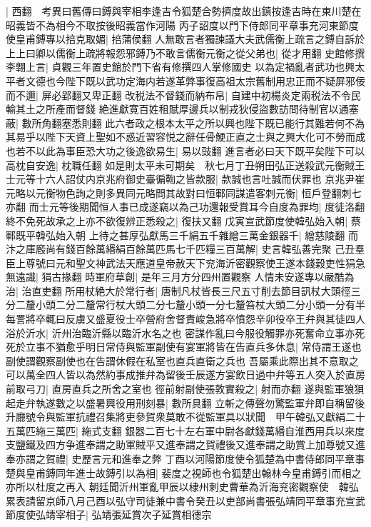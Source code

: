 |{
	西翻　考異曰舊傳曰鎛與宰相李逢吉令狐楚合勢擠度故出鎮按逢吉時在東川楚在昭義皆不為相今不取按後昭義當作河陽}
丙子詔度以門下侍郎同平章事充河東節度使皇甫鎛專以掊克取媚|{
	掊蒲侯翻}
人無敢言者獨諫議大夫武儒衡上疏言之鎛自訴於上上曰卿以儒衡上疏將報怨邪鎛乃不敢言儒衡元衡之從父弟也|{
	從才用翻}
史館修撰李翺上言|{
	貞觀三年置史館於門下省有修撰四人掌修國史}
以為定禍亂者武功也興太平者文德也今陛下既以武功定海内若遂革弊事復高祖太宗舊制用忠正而不疑屏邪佞而不邇|{
	屏必郢翻又卑正翻}
改税法不督錢而納布帛|{
	自建中初楊炎定兩税法不令民輸其土之所產而督錢}
絶進獻寛百姓租賦厚邊兵以制戎狄侵盜數訪問待制官以通塞蔽|{
	數所角翻塞悉則翻}
此六者政之根本太平之所以興也陛下既已能行其難若何不為其易乎以陛下天資上聖如不惑近習容悦之辭任骨鯁正直之士與之興大化可不勞而成也若不以此為事臣恐大功之後逸欲易生|{
	易以豉翻}
進言者必曰天下既平矣陛下可以高枕自安逸|{
	枕職任翻}
如是則太平未可期矣　秋七月丁丑朔田弘正送殺武元衡賊王士元等十六人詔仗内京兆府御史臺徧鞫之皆款服|{
	款誠也言吐誠而伏罪也}
京兆尹崔元略以元衡物色詢之則多異同元略問其故對曰恒鄆同謀遣客刺元衡|{
	恒戶登翻刺七亦翻}
而士元等後期聞恒人事已成遂竊以為己功還報受賞耳今自度為罪均|{
	度徒洛翻}
終不免死故承之上亦不欲復辨正悉殺之|{
	復扶又翻}
戊寅宣武節度使韓弘始入朝|{
	蔡鄆既平韓弘始入朝}
上待之甚厚弘獻馬三千絹五千雜繒三萬金銀器千|{
	繒慈陵翻}
而汴之庫廏尚有錢百餘萬緡絹百餘萬匹馬七千匹糧三百萬解|{
	史言韓弘善完聚}
己丑羣臣上尊號曰元和聖文神武法天應道皇帝赦天下兖海沂密觀察使王遂本錢穀吏性狷急無遠識|{
	狷古掾翻}
時軍府草創|{
	是年三月方分四州置觀察}
人情未安遂專以嚴酷為治|{
	治直吏翻}
所用杖絶大於常行者|{
	唐制凡杖皆長三尺五寸削去節目訊杖大頭徑三分二釐小頭二分二釐常行杖大頭二分七釐小頭一分七釐笞杖大頭二分小頭一分有半}
每詈將卒輒曰反虜又盛夏役士卒營府舍督責峻急將卒憤怨辛卯役卒王弁與其徒四人浴於沂水|{
	沂州治臨沂縣以臨沂水名之也}
密謀作亂曰今服役觸罪亦死奮命立事亦死死於立事不猶愈乎明日常侍與監軍副使有宴軍將皆在告直兵多休息|{
	常侍謂王遂也副使謂觀察副使也在告謂休假在私室也直兵直衛之兵也}
吾屬乘此際出其不意取之可以萬全四人皆以為然約事成推弁為留後壬辰遂方宴飲日過中弁等五人突入於直房前取弓刀|{
	直房直兵之所舍之室也}
徑前射副使張敦實殺之|{
	射而亦翻}
遂與監軍狼狽起走弁執遂數之以盛暑興役用刑刻暴|{
	數所具翻}
立斬之傳聲勿驚監軍弁即自稱留後升廳號令與監軍抗禮召集將吏參賀衆莫敢不從監軍具以狀聞　甲午韓弘又獻絹二十五萬匹絁三萬匹|{
	絁式支翻}
銀器二百七十左右軍中尉各獻錢萬緡自淮西用兵以來度支鹽鐵及四方争進奉謂之助軍賊平又進奉謂之賀禮後又進奉謂之助賞上加尊號又進奉亦謂之賀禮|{
	史歷言元和進奉之弊}
丁酉以河陽節度使令狐楚為中書侍郎同平章事楚與皇甫鎛同年進士故鎛引以為相|{
	裴度之視師也令狐楚出翰林今皇甫鎛引而相之亦所以杜度之再入}
朝廷聞沂州軍亂甲辰以棣州刺史曹華為沂海兖密觀察使　韓弘累表請留京師八月己酉以弘守司徒兼中書令癸丑以吏部尚書張弘靖同平章事充宣武節度使弘靖宰相子|{
	弘靖張延賞次子延賞相德宗}
